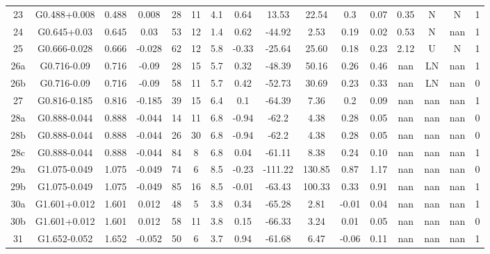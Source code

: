 \begin{table}
\begin{tabular}{cccccccccccccccc}
23 & G0.488+0.008 & 0.488 & 0.008 & 28 & 11 & 4.1 & 0.64 & 13.53 & 22.54 & 0.3 & 0.07 & 0.35 & N & N & 1 \\
24 & G0.645+0.03 & 0.645 & 0.03 & 53 & 12 & 1.4 & 0.62 & -44.92 & 2.53 & 0.19 & 0.02 & 0.53 & N & nan & 1 \\
25 & G0.666-0.028 & 0.666 & -0.028 & 62 & 12 & 5.8 & -0.33 & -25.64 & 25.60 & 0.18 & 0.23 & 2.12 & U & N & 1 \\
26a & G0.716-0.09 & 0.716 & -0.09 & 28 & 15 & 5.7 & 0.32 & -48.39 & 50.16 & 0.26 & 0.46 & nan & LN & nan & 1 \\
26b & G0.716-0.09 & 0.716 & -0.09 & 58 & 11 & 5.7 & 0.42 & -52.73 & 30.69 & 0.23 & 0.33 & nan & LN & nan & 0 \\
27 & G0.816-0.185 & 0.816 & -0.185 & 39 & 15 & 6.4 & 0.1 & -64.39 & 7.36 & 0.2 & 0.09 & nan & nan & nan & 1 \\
28a & G0.888-0.044 & 0.888 & -0.044 & 14 & 11 & 6.8 & -0.94 & -62.2 & 4.38 & 0.28 & 0.05 & nan & nan & nan & 0 \\
28b & G0.888-0.044 & 0.888 & -0.044 & 26 & 30 & 6.8 & -0.94 & -62.2 & 4.38 & 0.28 & 0.05 & nan & nan & nan & 0 \\
28c & G0.888-0.044 & 0.888 & -0.044 & 84 & 8 & 6.8 & 0.04 & -61.11 & 8.38 & 0.24 & 0.10 & nan & nan & nan & 1 \\
29a & G1.075-0.049 & 1.075 & -0.049 & 74 & 6 & 8.5 & -0.23 & -111.22 & 130.85 & 0.87 & 1.17 & nan & nan & nan & 0 \\
29b & G1.075-0.049 & 1.075 & -0.049 & 85 & 16 & 8.5 & -0.01 & -63.43 & 100.33 & 0.33 & 0.91 & nan & nan & nan & 1 \\
30a & G1.601+0.012 & 1.601 & 0.012 & 48 & 5 & 3.8 & 0.34 & -65.28 & 2.81 & -0.01 & 0.04 & nan & nan & nan & 1 \\
30b & G1.601+0.012 & 1.601 & 0.012 & 58 & 11 & 3.8 & 0.15 & -66.33 & 3.24 & 0.01 & 0.05 & nan & nan & nan & 0 \\
31 & G1.652-0.052 & 1.652 & -0.052 & 50 & 6 & 3.7 & 0.94 & -61.68 & 6.47 & -0.06 & 0.11 & nan & nan & nan & 1 \\
\end{tabular}
\end{table}

